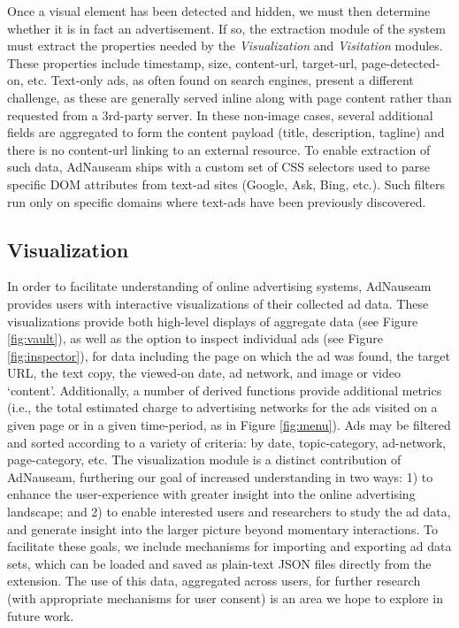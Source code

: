 \documentclass[conference]{IEEEtran}
\begin{document}
Once a visual element has been detected and hidden, we must then determine whether it is in fact an advertisement. If so, the extraction module of the system must extract the properties needed by the \emph{Visualization} and \emph{Visitation} modules. These properties include timestamp, size, content-url, target-url, page-detected-on, etc. Text-only ads, as often found on search engines, present a different challenge, as these are generally served inline along with page content rather than requested from a 3rd-party server. In these non-image cases, several additional fields are aggregated to form the content payload (title, description, tagline) and there is no content-url linking to an external resource. To enable extraction of such data, AdNauseam ships with a custom set of CSS selectors used to parse specific DOM attributes from text-ad sites (Google, Ask, Bing, etc.). Such filters run only on specific domains where text-ads have been previously discovered.


\subsection{Visualization}

In order to facilitate understanding of online advertising systems, AdNauseam provides users with interactive visualizations of their collected ad data. These visualizations provide both high-level displays of aggregate data (see Figure \ref{fig:vault}), as well as the option to inspect individual ads (see Figure \ref{fig:inspector}), for data  including the page on which the ad was found, the target URL, the text copy, the viewed-on date, ad network, and image or video ‘content’. Additionally, a number of derived functions provide additional metrics (i.e., the total estimated charge to advertising networks for the ads visited on a given page or in a given time-period, as in Figure \ref{fig:menu}). Ads may be filtered and sorted according to a variety of criteria: by date, topic-category, ad-network, page-category, etc. The visualization module is a distinct contribution of AdNauseam, furthering our goal of increased understanding in two ways: 1) to enhance the user-experience with greater insight into the online advertising landscape; and 2) to enable interested users and researchers to study the ad data, and generate insight into the larger picture beyond momentary interactions. To facilitate these goals, we include mechanisms for importing and exporting ad data sets, which can be loaded and saved as plain-text JSON files directly from the extension. The use of this data, aggregated across users, for further research (with appropriate mechanisms for user consent) is an area we hope to explore in future work.
\end{document}
